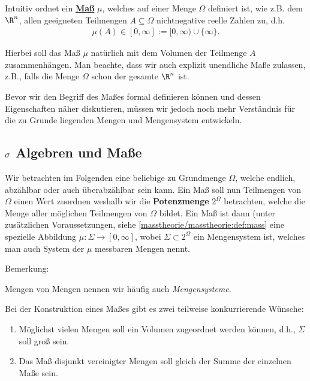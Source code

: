 \documentclass[letterpaper,10pt,german]{jupyterBook}
\begin{document}
\par
Intuitiv ordnet ein \href{https://de.wikipedia.org/wiki/Ma\%c3\%9f\_(Mathematik)}{\textbf{Maß}} \(\mu\), welches auf einer Menge \(\Omega\) definiert ist, wie z.B. dem \(\R^n\), allen geeigneten Teilmengen \(A\subseteq \Omega\) nichtnegative reelle Zahlen zu, d.h.
\begin{align*}
\mu(A)\in[0,\infty] := [0,\infty)\cup\{\infty\}.
\end{align*}
\par
Hierbei soll das Maß \(\mu\) natürlich mit dem Volumen der Teilmenge \(A\) zusammenhängen.
Man beachte, dass wir auch explizit unendliche Maße zulassen, z.B., falls die Menge \(\Omega\) schon der gesamte \(\R^n\) ist.

\par
Bevor wir den Begriff des Maßes formal definieren können und dessen Eigenschaften näher diskutieren, müssen wir jedoch noch mehr Verständnis für die zu Grunde liegenden Mengen und Mengensystem entwickeln.


\subsection{\protect\(\sigma\protect\) Algebren und Maße}
\label{\detokenize{masstheorie/masstheorie:sigma-algebren-und-masze}}\label{\detokenize{masstheorie/masstheorie:s-sigmaalg}}
\par
Wir betrachten im Folgenden eine beliebige zu Grundmenge \(\Omega\), welche endlich, abzählbar oder auch überabzählbar sein kann. Ein Maß soll nun Teilmengen von \(\Omega\) einen Wert zuordnen weshalb wir die \textbf{Potenzmenge} \(2^\Omega\) betrachten, welche die Menge aller möglichen Teilmengen von \(\Omega\) bildet. Ein Maß ist dann (unter zusätzlichen Voraussetzungen, siehe \cref{masstheorie/masstheorie:def:mass}  eine spezielle Abbildung \(\mu:\Sigma\to[0,\infty]\), wobei \(\Sigma\subset 2^\Omega\) ein Mengensystem ist, welches man auch System der \(\mu\) messbaren Mengen nennt.

\begin{emphBox}{}{}{Bemerkung:}
\par
Mengen von Mengen nennen wir häufig auch \emph{Mengensysteme}.
\end{emphBox}

\par
Bei der Konstruktion eines Maßes gibt es zwei teilweise konkurrierende Wünsche:
\begin{enumerate}

\item {} 
\par
Möglichst vielen Mengen soll ein Volumen zugeordnet werden können, d.h., \(\Sigma\) soll groß sein.

\item {} 
\par
Das Maß disjunkt vereinigter Mengen soll gleich der Summe der einzelnen Maße sein.

\end{enumerate}
\end{document}
